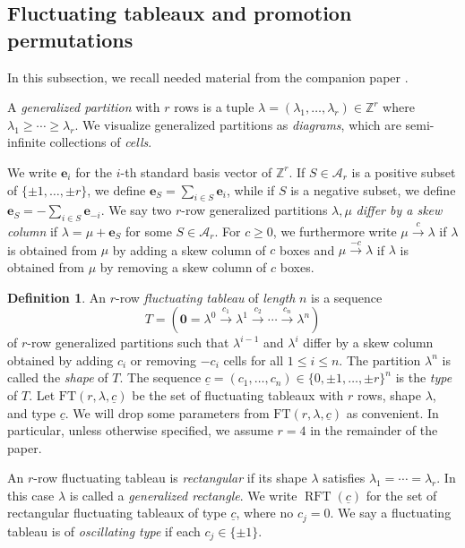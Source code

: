 \documentclass{amsart}
\theoremstyle{definition}
\newtheorem{definition}[theorem]{Definition}
\theoremstyle{remark}
\numberwithin{equation}{section}
\DeclareMathOperator{\rft}{RFT}
\newcommand{\too}[1]{\stackrel{#1}{\to}}
\begin{document}
\subsection{Fluctuating tableaux and promotion permutations}
\label{sec:background-fluctuating}
In this subsection, we recall needed material from the companion paper \cite{fluctuating-paper}.


A \emph{generalized partition} with $r$ rows is a tuple $\lambda = (\lambda_1,\ldots, \lambda_r) \in \mathbb{Z}^r$ where $\lambda_1 \geq \cdots \geq \lambda_r$. We visualize generalized partitions as \emph{diagrams}, which are semi-infinite collections of \emph{cells}. 

We write $\mathbf{e}_i$ for the $i$-th standard basis vector of $\mathbb{Z}^r$. If $S \in \mathcal{A}_r$ is a positive subset of $\{\pm 1,\ldots,\pm r\}$, we define $\mathbf{e}_S = \sum_{i \in S} \mathbf{e}_i$, while if $S$ is a negative subset, we define $\mathbf{e}_S = - \sum_{i \in S} \mathbf{e}_{-i}$. We say two $r$-row generalized partitions $\lambda, \mu$ \emph{differ by a skew column} if $\lambda=\mu + \mathbf{e}_S$ for some $S \in \mathcal{A}_r$. For $c \geq 0$, we furthermore write $\mu \too{c} \lambda$ if $\lambda$ is obtained from $\mu$ by adding a skew column of $c$ boxes and $\mu \too{-c} \lambda$ if $\lambda$ is obtained from $\mu$ by removing a skew column of $c$ boxes. 

\begin{definition}
An $r$-row \emph{fluctuating tableau} of \emph{length} $n$ is a sequence
\[ T = (\mathbf{0}=\lambda^0 \too{c_1} \lambda^1 \too{c_2} \cdots \too{c_n} \lambda^n) \]
of $r$-row generalized partitions such that $\lambda^{i-1}$ and $\lambda^i$ differ by a skew column obtained by adding $c_i$ or removing $-c_i$ cells for all $1 \leq i \leq n$. The partition  $\lambda^n$ is called the \emph{shape} of $T$. The sequence $\underline{c} = (c_1, \ldots, c_n) \in \{0, \pm 1, \ldots, \pm r\}^n$ is the \emph{type} of $T$. Let $\mathrm{FT}(r,\lambda, \underline{c})$ be the set of fluctuating tableaux with $r$ rows, shape $\lambda$, and type $\underline{c}$. We will drop some parameters from $\mathrm{FT}(r, \lambda, \underline{c})$ as convenient. In particular, unless otherwise specified, we assume $r=4$ in the remainder of the paper.

An $r$-row fluctuating tableau is \emph{rectangular} if its shape $\lambda$ satisfies $\lambda_1=\cdots=\lambda_r$. In this case $\lambda$ is called a \emph{generalized rectangle}. We write $\rft(\underline{c})$ for the set of rectangular fluctuating tableaux of type $\underline{c}$, where no $c_j = 0$. We say a fluctuating tableau is of \emph{oscillating type}  
  if each $c_j\in \{\pm 1\}$.
\end{definition}
\end{document}
